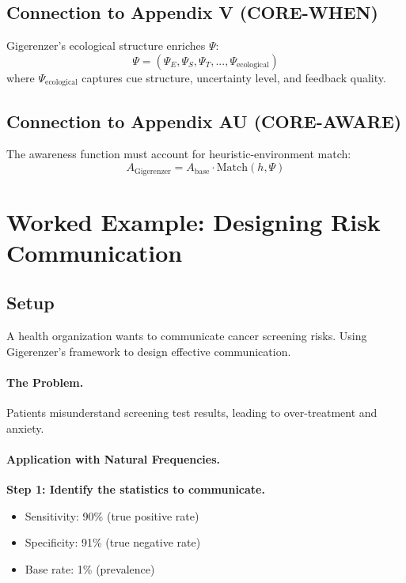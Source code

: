 \subsection{Connection to Appendix V (CORE-WHEN)}

Gigerenzer's ecological structure enriches $\Psi$:
\begin{equation}
\Psi = (\Psi_E, \Psi_S, \Psi_T, ..., \Psi_{\text{ecological}})
\end{equation}
where $\Psi_{\text{ecological}}$ captures cue structure, uncertainty level, and feedback quality.

\subsection{Connection to Appendix AU (CORE-AWARE)}

The awareness function must account for heuristic-environment match:
\begin{equation}
A_{\text{Gigerenzer}} = A_{\text{base}} \cdot \text{Match}(h, \Psi)
\end{equation}


\section{Worked Example: Designing Risk Communication}
\label{sec:gi-example}

\subsection{Setup}
A health organization wants to communicate cancer screening risks. Using Gigerenzer's framework to design effective communication.

\paragraph{The Problem.} Patients misunderstand screening test results, leading to over-treatment and anxiety.

\paragraph{Application with Natural Frequencies.}

\textbf{Step 1: Identify the statistics to communicate.}
\begin{itemize}[nosep]
\item Sensitivity: 90\% (true positive rate)
\item Specificity: 91\% (true negative rate)
\item Base rate: 1\% (prevalence)
\end{itemize}

